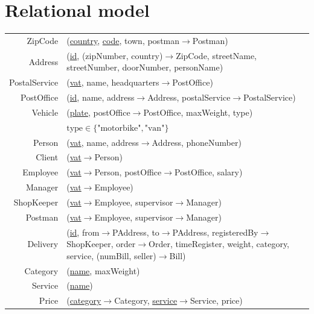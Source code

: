 \documentclass{report}[a4paper]
\theoremstyle{remark}
\begin{document}
\chapter{Relational model}
\begin{center} \setlength{\tabcolsep}{1pt}
    \begin{tabular}{r p{144mm}}
        ZipCode         & (\uline{country}, \uline{code}, town, postman$\rightarrow$Postman)  \\
        Address         & (\uline{id}, (zipNumber, country)$\rightarrow$ZipCode, streetName, streetNumber, doorNumber, personName) \\
        PostalService   & (\uline{vat}, name, headquarters$\rightarrow$PostOffice)              \\
        PostOffice      & (\uline{id}, name, address$\rightarrow$Address, postalService$\rightarrow$PostalService) \\
        Vehicle         & (\uline{plate}, postOffice$\rightarrow$PostOffice, maxWeight, type) \\
                        & $\text{type} \in \{\text{"motorbike"}, \text{"van"}\}$\\
        Person          & (\uline{vat}, name, address$\rightarrow$Address, phoneNumber)         \\
        Client          & (\uline{vat}$\rightarrow$Person)                                      \\
        Employee        & (\uline{vat}$\rightarrow$Person, postOffice$\rightarrow$PostOffice, salary) \\
        Manager         & (\uline{vat}$\rightarrow$Employee)                                    \\
        ShopKeeper      & (\uline{vat}$\rightarrow$Employee, supervisor$\rightarrow$Manager)    \\
        Postman         & (\uline{vat}$\rightarrow$Employee, supervisor$\rightarrow$Manager)    \\
        Delivery        & (\uline{id}, from$\rightarrow$PAddress, to$\rightarrow$PAddress, registeredBy$\rightarrow$ShopKeeper, order$\rightarrow$Order, timeRegister, weight, category, service, (numBill, seller)$\rightarrow$Bill) \\
        Category        & (\uline{name}, maxWeight) \\
        Service         & (\uline{name}) \\
        Price           & (\uline{category}$\rightarrow$Category, \uline{service}$\rightarrow$Service, price) \\

\end{tabular}
\end{center}
\end{document}
